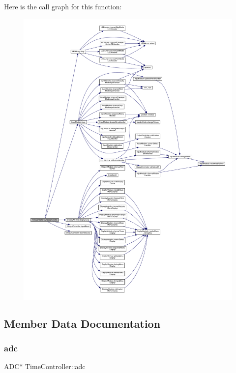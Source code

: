 Here is the call graph for this function\+:
\nopagebreak
\begin{figure}[H]
\begin{center}
\leavevmode
\includegraphics[width=350pt]{class_time_controller_ae1e9001e3739f3e077f4679b98650e91_cgraph}
\end{center}
\end{figure}


\subsection{Member Data Documentation}
\mbox{\label{class_time_controller_a1b19c7d0b6f30005ef064f75d6e88cfd}} 
\subsubsection{\texorpdfstring{adc}{adc}}
{\footnotesize\ttfamily A\+DC$\ast$ Time\+Controller\+::adc\hspace{0.3cm}{\ttfamily [private]}}

